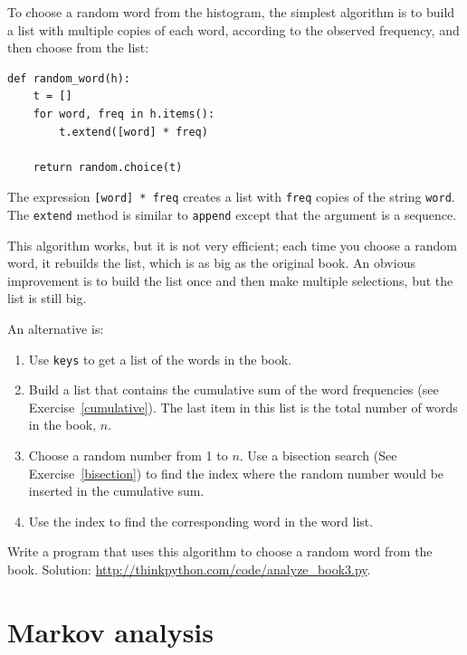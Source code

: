\documentclass[10pt]{book}
\begin{document}
To choose a random word from the histogram, the simplest algorithm
is to build a list with multiple copies of each word, according
to the observed frequency, and then choose from the list:

\begin{verbatim}
def random_word(h):
    t = []
    for word, freq in h.items():
        t.extend([word] * freq)

    return random.choice(t)
\end{verbatim}
%
The expression {\tt [word] * freq} creates a list with {\tt freq}
copies of the string {\tt word}.  The {\tt extend}
method is similar to {\tt append} except that the argument is
a sequence.

\begin{exercise}
\label{randhist}

This algorithm works, but it is not very efficient; each time you
choose a random word, it rebuilds the list, which is as big as
the original book.  An obvious improvement is to build the list
once and then make multiple selections, but the list is still big.

An alternative is:

\begin{enumerate}

\item Use {\tt keys} to get a list of the words in the book.

\item Build a list that contains the cumulative sum of the word
  frequencies (see Exercise~\ref{cumulative}).  The last item
  in this list is the total number of words in the book, $n$.
  
\item Choose a random number from 1 to $n$.  Use a bisection search
  (See Exercise~\ref{bisection}) to find the index where the random
  number would be inserted in the cumulative sum.

\item Use the index to find the corresponding word in the word list.

\end{enumerate}

Write a program that uses this algorithm to choose a random
word from the book.  Solution: \url{http://thinkpython.com/code/analyze_book3.py}.

\end{exercise}



\section{Markov analysis}
\label{markov}
\end{document}
